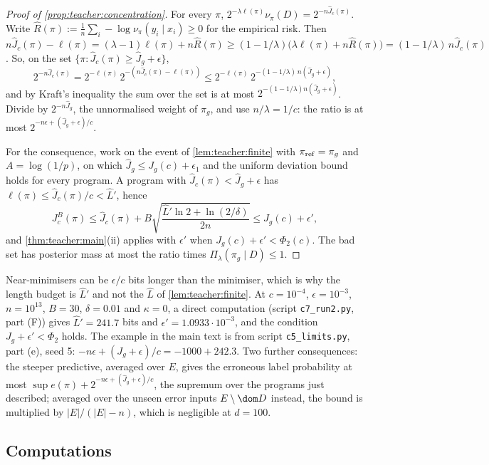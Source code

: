 \begin{proof}[Proof of \cref{prop:teacher:concentration}]
For every $\pi$, $2^{-\lambda\ell(\pi)}\nu_\pi(D)=2^{-n\hat J_c(\pi)}$. Write $\hat R(\pi):=\frac1n\sum_i-\log\nu_\pi(y_i\mid x_i)\ge0$ for the empirical risk. Then $n\hat J_c(\pi)-\ell(\pi)=(\lambda-1)\ell(\pi)+n\hat R(\pi)\ge(1-1/\lambda)\big(\lambda\ell(\pi)+n\hat R(\pi)\big)=(1-1/\lambda)\,n\hat J_c(\pi)$. So, on the set $\{\pi:\hat J_c(\pi)\ge\hat J_g+\epsilon\}$,
\[
2^{-n\hat J_c(\pi)}=2^{-\ell(\pi)}\,2^{-(n\hat J_c(\pi)-\ell(\pi))}\le2^{-\ell(\pi)}\,2^{-(1-1/\lambda)\,n(\hat J_g+\epsilon)},
\]
and by Kraft's inequality the sum over the set is at most $2^{-(1-1/\lambda)n(\hat J_g+\epsilon)}$. Divide by $2^{-n\hat J_g}$, the unnormalised weight of $\pi_g$, and use $n/\lambda=1/c$: the ratio is at most $2^{-n\epsilon+(\hat J_g+\epsilon)/c}$.

For the consequence, work on the event of \cref{lem:teacher:finite} with $\pi_{\rm ref}=\pi_g$ and $A=\log(1/p)$, on which $\hat J_g\le J_g(c)+\epsilon_1$ and the uniform deviation bound holds for every program. A program with $\hat J_c(\pi)<\hat J_g+\epsilon$ has $\ell(\pi)\le\hat J_c(\pi)/c<\hat L'$, hence
\[
J^B_c(\pi)\le\hat J_c(\pi)+B\sqrt{\frac{\hat L'\ln2+\ln(2/\delta)}{2n}}\le J_g(c)+\epsilon',
\]
and \cref{thm:teacher:main}(ii) applies with $\epsilon'$ when $J_g(c)+\epsilon'<\Phi_2(c)$. The bad set has posterior mass at most the ratio times $\Pi_\lambda(\pi_g\mid D)\le1$.
\end{proof}

Near-minimisers can be $\epsilon/c$ bits longer than the minimiser, which is why the length budget is $\hat L'$ and not the $\hat L$ of \cref{lem:teacher:finite}. At $c=10^{-4}$, $\epsilon=10^{-3}$, $n=10^{13}$, $B=30$, $\delta=0.01$ and $\kappa=0$, a direct computation (script \texttt{c7\_\allowbreak{}run2.py}, part (F)) gives $\hat L'=241.7$ bits and $\epsilon'=1.0933\cdot10^{-3}$, and the condition $J_g+\epsilon'<\Phi_2$ holds. The example in the main text is from script \texttt{c5\_\allowbreak{}limits.py}, part (e), seed 5: $-n\epsilon+(J_g+\epsilon)/c=-1000+242.3$. Two further consequences: the steeper predictive, averaged over $E$, gives the erroneous label probability at most $\sup e(\pi)+2^{-n\epsilon+(\hat J_g+\epsilon)/c}$, the supremum over the programs just described; averaged over the unseen error inputs $E\setminus\dom D$ instead, the bound is multiplied by $|E|/(|E|-n)$, which is negligible at $d=100$.

\subsection{Computations}\label{app:teacher:computations}


